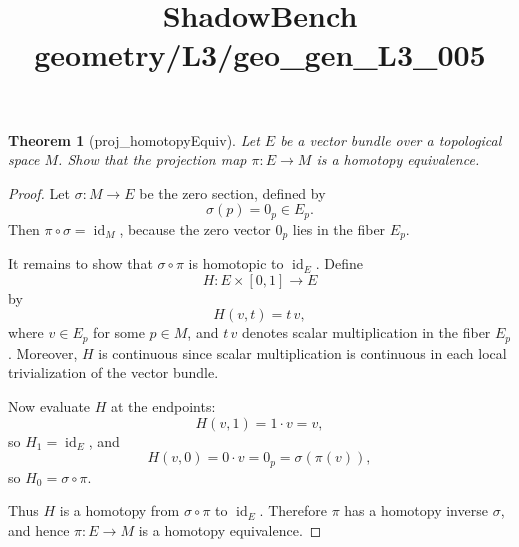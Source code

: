 \documentclass{article}
\title{ShadowBench geometry/L3/geo\_gen\_L3\_005}
\newtheorem{theorem}{Theorem}
\begin{document}
\maketitle

\begin{theorem}[proj_homotopyEquiv]
Let $E$ be a vector bundle over a topological space $M$. 
Show that the projection map $\pi : E \to M$ is a homotopy equivalence.
\end{theorem}

\begin{proof}
Let $\sigma \colon M \to E$ be the zero section, defined by
\[
\sigma(p)=0_p \in E_p .
\]
Then $\pi \circ \sigma = \operatorname{id}_M$, because the zero vector $0_p$ lies in the fiber $E_p$.

It remains to show that $\sigma \circ \pi$ is homotopic to $\operatorname{id}_E$.
Define
\[
H \colon E \times [0,1] \to E
\]
by
\[
H(v,t)=t\,v ,
\]
where $v \in E_p$ for some $p \in M$, and $t\,v$ denotes scalar multiplication in the fiber $E_p$.
Moreover, $H$ is continuous since scalar multiplication is continuous in each local trivialization of the vector bundle.

Now evaluate $H$ at the endpoints:
\[
H(v,1)=1\cdot v=v,
\]
so $H_1=\operatorname{id}_E$, and
\[
H(v,0)=0\cdot v=0_p=\sigma(\pi(v)),
\]
so $H_0=\sigma\circ\pi$.

Thus $H$ is a homotopy from $\sigma\circ\pi$ to $\operatorname{id}_E$.
Therefore $\pi$ has a homotopy inverse $\sigma$, and hence $\pi \colon E \to M$ is a homotopy equivalence.
\end{proof}
\end{document}
